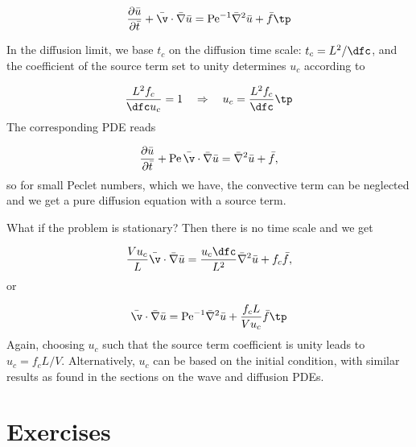 \documentclass[graybox,envcountchap,sectrefs,final]{svmonodo}
\begin{document}
\[
\frac{\partial\bar u}{\partial\bar t} +
\bar\v\cdot\bar \nabla\bar u =
\hbox{Pe}^{-1}\bar \nabla^2 \bar u + \bar f\tp
\]

In the diffusion limit, we base $t_c$ on the diffusion time scale:
$t_c=L^2/\dfc$, and the coefficient of the source term set to unity
determines $u_c$ according to

\[ \frac{L^2 f_c}{\dfc u_c} = 1\quad\Rightarrow\quad u_c = \frac{L^2 f_c}{\dfc}\tp\]
The corresponding PDE reads

\[
\frac{\partial\bar u}{\partial\bar t} +
\hbox{Pe}\,\bar\v\cdot\bar \nabla\bar u =
\bar\nabla^2 \bar u + \bar f,
\]
so for small Peclet numbers, which we have, the convective term can
be neglected and we get a pure diffusion equation with a source term.

What if the problem is stationary?
Then there is no time scale and we get

\[
\frac{V u_c}{L}\bar\v\cdot\bar \nabla \bar u =
\frac{u_c \dfc}{L^2}\bar\nabla^2 \bar u + f_c\bar f,
\]
or

\[
\bar\v\cdot\bar \nabla \bar u =
\hbox{Pe}^{-1}\bar\nabla^2 \bar u + \frac{f_c L}{V u_c}\bar f\tp
\]
Again, choosing $u_c$ such that the source term coefficient is unity leads
to $u_c= f_c L/V$.
Alternatively, $u_c$ can be based on the initial condition, with similar
results as found in the sections on the wave and diffusion PDEs.

\section{Exercises}
\end{document}
